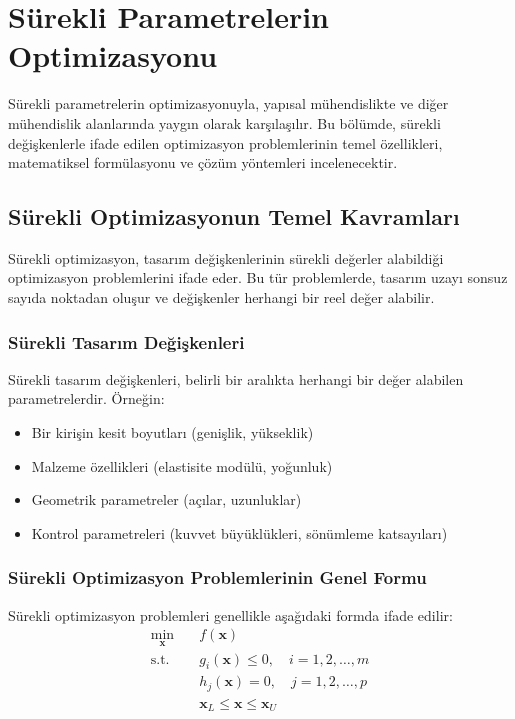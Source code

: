 \section{Sürekli Parametrelerin Optimizasyonu}
Sürekli parametrelerin optimizasyonuyla, yapısal mühendislikte ve diğer mühendislik alanlarında yaygın olarak karşılaşılır. Bu bölümde, sürekli değişkenlerle ifade edilen optimizasyon problemlerinin temel özellikleri, matematiksel formülasyonu ve çözüm yöntemleri incelenecektir.

\subsection{Sürekli Optimizasyonun Temel Kavramları}
Sürekli optimizasyon, tasarım değişkenlerinin sürekli değerler alabildiği optimizasyon problemlerini ifade eder. Bu tür problemlerde, tasarım uzayı sonsuz sayıda noktadan oluşur ve değişkenler herhangi bir reel değer alabilir.

\subsubsection{Sürekli Tasarım Değişkenleri}
Sürekli tasarım değişkenleri, belirli bir aralıkta herhangi bir değer alabilen parametrelerdir. Örneğin:
\begin{itemize}
    \item Bir kirişin kesit boyutları (genişlik, yükseklik)
    \item Malzeme özellikleri (elastisite modülü, yoğunluk)
    \item Geometrik parametreler (açılar, uzunluklar)
    \item Kontrol parametreleri (kuvvet büyüklükleri, sönümleme katsayıları)
\end{itemize}

\subsubsection{Sürekli Optimizasyon Problemlerinin Genel Formu}
Sürekli optimizasyon problemleri genellikle aşağıdaki formda ifade edilir:
\begin{align}
\min_{\mathbf{x}} \quad & f(\mathbf{x}) \\
\text{s.t.} \quad & g_i(\mathbf{x}) \leq 0, \quad i = 1, 2, \ldots, m \\
& h_j(\mathbf{x}) = 0, \quad j = 1, 2, \ldots, p \\
& \mathbf{x}_L \leq \mathbf{x} \leq \mathbf{x}_U
\end{align}

